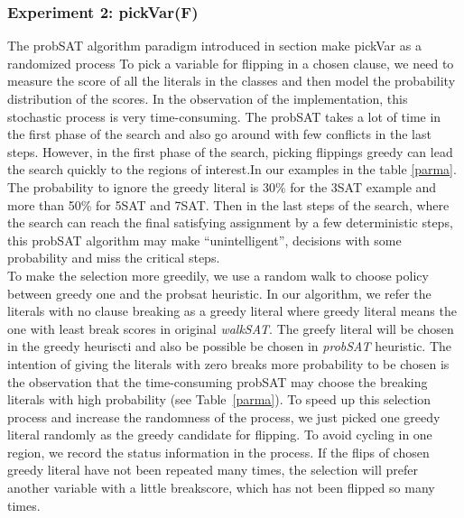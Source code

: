 \documentclass[12pt,a4paper,twoside]{scrartcl}
\numberwithin{equation}{section}
\begin{document}
\subsubsection{Experiment 2: pickVar(F)} 
\label{sec:Experiment 2} 
The probSAT algorithm paradigm introduced in section make pickVar as a randomized process To pick a variable for flipping in a chosen clause, we need to measure the score of all the literals in the classes and then model the probability distribution of the scores.  In the observation of the implementation, this stochastic process is very time-consuming.  The probSAT takes a lot of time in the first phase of the search and also go around with few conflicts in the last steps. However, in the first phase of the search, picking flippings greedy can lead the search quickly to the regions of interest.In our examples in the table \ref{parma}. The probability to ignore the greedy literal is 30\% for the 3SAT example and more than  50\% for 5SAT and 7SAT.  Then in the last steps of the search, where the search can reach the final satisfying assignment by a few deterministic steps, this probSAT algorithm may make  ``unintelligent'', decisions with some probability and miss the critical steps. \\
To make the selection more greedily, we use a random walk to choose policy between greedy one and the probsat heuristic.  In our algorithm, we refer the literals with no clause breaking as a greedy literal where greedy literal means the one with least break scores in original \emph{walkSAT}. The greefy literal will be chosen in the greedy heuriscti and also be possible be chosen in \emph{probSAT} heuristic. The intention of giving the literals with zero breaks more probability to be chosen is the observation that the time-consuming probSAT may choose the breaking literals with high probability (see Table~\ref{parma}).  To speed up this selection process and increase the randomness of the process, we just picked one greedy literal randomly as the greedy candidate for flipping.  To avoid cycling in one region, we record the status information in the process.  If the flips of chosen greedy literal have not been repeated many times, the selection will prefer another variable with a little breakscore, which has not been flipped so many times.  
\end{document}
